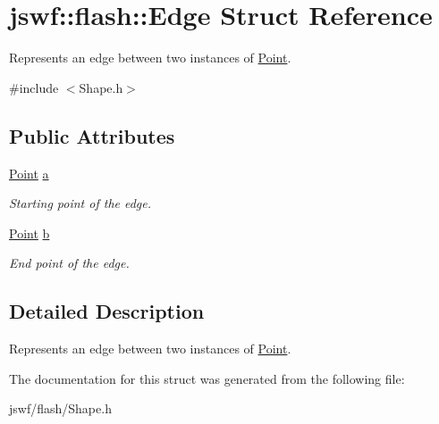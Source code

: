 \hypertarget{structjswf_1_1flash_1_1_edge}{\section{jswf\+:\+:flash\+:\+:Edge Struct Reference}
\label{structjswf_1_1flash_1_1_edge}
}


Represents an edge between two instances of \hyperlink{structjswf_1_1flash_1_1_point}{Point}.  




{\ttfamily \#include $<$Shape.\+h$>$}

\subsection*{Public Attributes}
\begin{DoxyCompactItemize}
\item 
\hypertarget{structjswf_1_1flash_1_1_edge_a9342bb598582a1662085a2216b22e79d}{\hyperlink{structjswf_1_1flash_1_1_point}{Point} \hyperlink{structjswf_1_1flash_1_1_edge_a9342bb598582a1662085a2216b22e79d}{a}}\label{structjswf_1_1flash_1_1_edge_a9342bb598582a1662085a2216b22e79d}

\begin{DoxyCompactList}\small\item\em Starting point of the edge. \end{DoxyCompactList}\item 
\hypertarget{structjswf_1_1flash_1_1_edge_a14859e594a6bb8a7bee90cc200080f7c}{\hyperlink{structjswf_1_1flash_1_1_point}{Point} \hyperlink{structjswf_1_1flash_1_1_edge_a14859e594a6bb8a7bee90cc200080f7c}{b}}\label{structjswf_1_1flash_1_1_edge_a14859e594a6bb8a7bee90cc200080f7c}

\begin{DoxyCompactList}\small\item\em End point of the edge. \end{DoxyCompactList}\end{DoxyCompactItemize}


\subsection{Detailed Description}
Represents an edge between two instances of \hyperlink{structjswf_1_1flash_1_1_point}{Point}. 

The documentation for this struct was generated from the following file\+:\begin{DoxyCompactItemize}
\item 
jswf/flash/Shape.\+h\end{DoxyCompactItemize}
